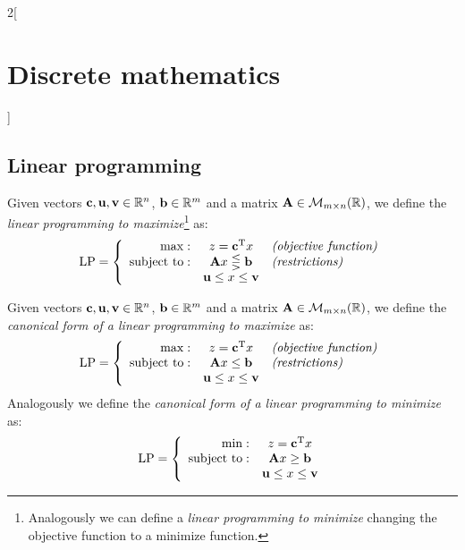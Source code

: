 \documentclass[../../../main.tex]{subfiles}
\begin{document}
\begin{multicols}{2}[\section{Discrete mathematics}]
  \subsection{Linear programming}
  \begin{definition}
    Given vectors $\boldsymbol{\mathrm{c}},\boldsymbol{\mathrm{u}},\boldsymbol{\mathrm{v}}\in\mathbb{R} ^n$, $\boldsymbol{\mathrm{b}}\in\mathbb{R} ^m$ and a matrix $\boldsymbol{\mathrm{A}}\in\mathcal{M}_{m\times n}(\mathbb{R} )$, we define the \textit{linear programming to maximize}\footnote{Analogously we can define a \textit{linear programming to minimize} changing the objective function to a minimize function.} as: $$\text{LP}=\left\{\begin{array}{rcl}
        \max:              & z=\vb{c}^{\mathrm{T}}x                                 & \textit{(objective function)} \\
        \text{subject to}: & \boldsymbol{\mathrm{A}}x\lesseqgtr \boldsymbol{\mathrm{b}} & \textit{(restrictions)}       \\
                           & \boldsymbol{\mathrm{u}}\leq x\leq \boldsymbol{\mathrm{v}}  &
      \end{array}\right.$$
  \end{definition}
  \begin{definition}
    Given vectors $\boldsymbol{\mathrm{c}},\boldsymbol{\mathrm{u}},\boldsymbol{\mathrm{v}}\in\mathbb{R} ^n$, $\boldsymbol{\mathrm{b}}\in\mathbb{R} ^m$ and a matrix $\boldsymbol{\mathrm{A}}\in\mathcal{M}_{m\times n}(\mathbb{R} )$, we define the \textit{canonical form of a linear programming to maximize} as: $$\text{LP}=\left\{\begin{array}{rcl}
        \max:              & z=\vb{c}^{\mathrm{T}}x                                & \textit{(objective function)} \\
        \text{subject to}: & \boldsymbol{\mathrm{A}}x\leq \boldsymbol{\mathrm{b}}      & \textit{(restrictions)}       \\
                           & \boldsymbol{\mathrm{u}}\leq x\leq \boldsymbol{\mathrm{v}} &
      \end{array}\right.$$
    Analogously we define the \textit{canonical form of a linear programming to minimize} as: $$\text{LP}=\left\{\begin{array}{rc}
        \min:              & z=\vb{c}^{\mathrm{T}}x                                \\
        \text{subject to}: & \boldsymbol{\mathrm{A}}x\geq \boldsymbol{\mathrm{b}}      \\
                           & \boldsymbol{\mathrm{u}}\leq x\leq \boldsymbol{\mathrm{v}}
      \end{array}\right.$$

\end{definition}
\end{multicols}
\end{document}
